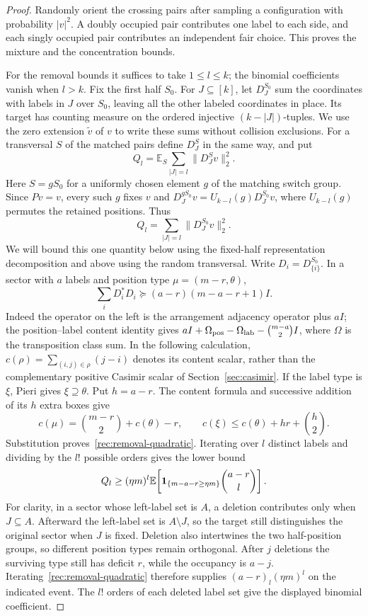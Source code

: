 \begin{proof}
Randomly orient the crossing pairs after sampling a configuration with
probability $|v|^2$.  A doubly occupied pair contributes one label to each
side, and each singly occupied pair contributes an independent fair
choice.  This proves the mixture and the concentration bounds.

For the removal bounds it suffices to take $1\le l\le k$; the
binomial coefficients vanish when $l>k$.  Fix the first half $S_0$.
For $J\subseteq[k]$, let $D_J^{S_0}$
sum the coordinates with labels in $J$ over $S_0$, leaving all the
other labeled coordinates in place.  Its target has counting measure
on the ordered injective $(k-|J|)$-tuples.  We use the zero extension
$\widetilde v$ of $v$ to write these sums without collision exclusions.
For a transversal $S$ of the matched pairs define $D_J^S$ in the same
way, and put
\[
 Q_l=\mathbb E_S\sum_{|J|=l}\|D_J^S v\|_2^2.
\]
Here $S=gS_0$ for a uniformly chosen element $g$ of the matching
switch group.  Since $Pv=v$, every such $g$ fixes $v$ and
$D_J^{gS_0}v=U_{k-l}(g)D_J^{S_0}v$, where $U_{k-l}(g)$ permutes
the retained positions.  Thus
\[
 Q_l=\sum_{|J|=l}\|D_J^{S_0}v\|_2^2.
\]
We will bound this one quantity below using the fixed-half
representation decomposition and above using the random transversal.
Write $D_i=D_{\{i\}}^{S_0}$.  In a sector
with $a$ labels and position type $\mu=(m-r,\theta)$,
\begin{equation}\label{rec:removal-quadratic}
 \sum_iD_i^*D_i\succeq(a-r)(m-a-r+1)I.
\end{equation}
Indeed the operator on the left is the arrangement adjacency operator
plus $aI$; the position--label content identity
\cite[Lemma 3.1 and Proposition 3.3]{AraujoBratten2017} gives
$aI+\Omega_{\rm pos}-\Omega_{\rm lab}-{m-a\choose2}I$, where $\Omega$
is the transposition class sum.  In the following calculation,
$c(\rho)=\sum_{(i,j)\in\rho}(j-i)$ denotes its content scalar,
rather than the complementary positive Casimir scalar of Section~\ref{sec:casimir}.
If the label type is $\xi$, Pieri gives
$\xi\supseteq\theta$.  Put $h=a-r$.  The content formula and successive
addition of its $h$ extra boxes give
\[
 c(\mu)={m-r\choose2}+c(\theta)-r,
 \qquad c(\xi)\le c(\theta)+hr+{h\choose2}.
\]
Substitution proves~\eqref{rec:removal-quadratic}.
Iterating over $l$ distinct labels and dividing by the $l!$ possible
orders gives the lower bound
\[
 Q_l
 \ge(\eta m)^l\mathbb E\!\left[
   \mathbf1_{\{m-a-r\ge\eta m\}}{a-r\choose l}\right].
\]
For clarity, in a sector whose left-label set is $A$, a deletion
contributes only when $J\subseteq A$.  Afterward the left-label set is
$A\setminus J$, so the target still distinguishes the original sector
when $J$ is fixed.  Deletion also intertwines the two half-position
groups, so different position types remain orthogonal.  After $j$
deletions the surviving type still has deficit $r$, while the occupancy
is $a-j$.  Iterating~\eqref{rec:removal-quadratic} therefore supplies
$(a-r)_{l}(\eta m)^l$ on the indicated event.  The $l!$ orders of
each deleted label set give the displayed binomial coefficient.


\end{proof}
